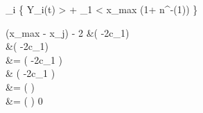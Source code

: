 


\taskone
    
\begin{code}
    \begin{imaths}
        _i \Leftrightarrow \Big\{ Y_i(t) >  +   _1  < x_{max} \cdot(1+ n^{-\Omega(1)}) \Big\}
    \end{imaths}
\end{code}

\newpage






\tasktwo

\begin{code}
    \begin{imaths}
        \cdot (x_{max} - x_j) - 2\delta
        &\ge {}\cdot \left(  -2c_1\right) \\
        &\ge {}\cdot \left(  -2c_1\right) \\
    	&= \cdot \left( -2c_1 \right) \\
        & \cdot \left( -2c_1 \right) \\
        &=  \cdot \left(  \right) \\ 
        &=  \cdot \left(  \right)
         0   
    \end{imaths}
\end{code}

